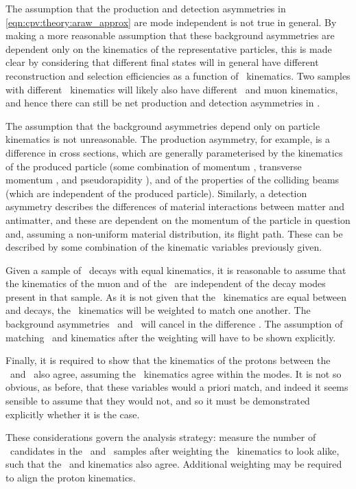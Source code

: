The assumption that the production and detection asymmetries in 
\cref{eqn:cpv:theory:araw_approx} are mode independent is not true in general.
By making a more reasonable assumption that these background asymmetries are 
dependent only on the kinematics of the representative particles, this is made 
clear by considering that different final states will in general have different 
reconstruction and selection efficiencies as a function of \PLambdac\ 
kinematics.
Two samples with different \PLambdac\ kinematics will likely also have 
different \PLambdab\ and muon kinematics, and hence there can still be net 
production and detection asymmetries in \dACP\@.

The assumption that the background asymmetries depend only on particle 
kinematics is not unreasonable.
The production asymmetry, for example, is a difference in cross sections, which 
are generally parameterised by the kinematics of the produced particle (some 
combination of momentum \ptot, transverse momentum \pT, and pseudorapidity 
\Eta), and of the properties of the colliding beams (which are independent of 
the produced particle).
Similarly, a detection asymmetry describes the differences of material 
interactions between matter and antimatter, and these are dependent on the 
momentum of the particle in question and, assuming a non-uniform material 
distribution, its flight path.
These can be described by some combination of the kinematic variables 
previously given.

Given a sample of \PLambdac\ decays with equal kinematics, it is reasonable to 
assume that the kinematics of the muon and of the \PLambdab\ are independent of 
the decay modes present in that sample.
As it is not given that the \PLambdac\ kinematics are equal between \LcTopKK 
and \LcToppipi decays, the \PLambdac\ kinematics will be weighted to match one 
another.
The background asymmetries \AP\ and \ADmu\ will cancel in the difference 
\dACP\@.
The assumption of matching \PLambdab\ and \Pmuon kinematics after the weighting 
will have to be shown explicitly.

Finally, it is required to show that the kinematics of the protons between the 
\pKK\ and \ppipi\ also agree, assuming the \hmhp\ kinematics agree within the 
modes.
It is not so obvious, as before, that these variables would a priori match, and 
indeed it seems sensible to assume that they would not, and so it must be 
demonstrated explicitly whether it is the case.

These considerations govern the analysis strategy: measure the number of 
\PLambdac\ candidates in the \pKK\ and \ppipi\ samples after weighting the 
\PLambdac\ kinematics to look alike, such that the \PLambdab\ and \Pmuon 
kinematics also agree.
Additional weighting may be required to align the proton kinematics.

